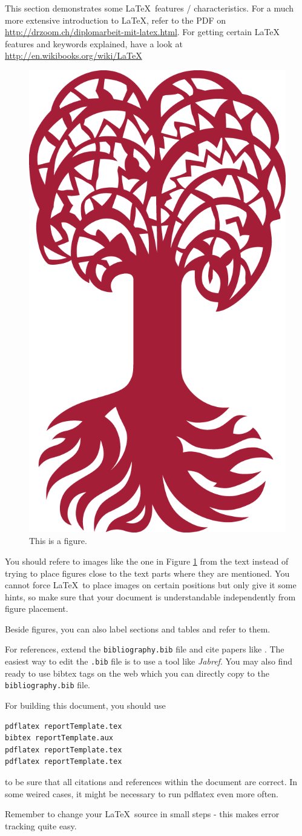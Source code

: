 \documentclass{utue} %
\begin{document}
This section demonstrates some \LaTeX~features / characteristics. For a much more extensive introduction to \LaTeX, refer to the PDF on \url{http://drzoom.ch/diplomarbeit-mit-latex.html}. For getting certain LaTeX features and keywords explained, have a look at \url{http://en.wikibooks.org/wiki/LaTeX}

\begin{figure}[h!]
  \centering
  \includegraphics[width=.4\columnwidth]{images/Tuebingen_CorporateElements/UT_BM_Rot_RGB_tr_01.png}
  \caption{This is a figure.}
  \label{fig:figure1}
\end{figure}

You should refere to images like the one in Figure \ref{fig:figure1} from the text instead of trying to place figures close to the text parts where they are mentioned. You cannot force \LaTeX~to place images on certain positions but only give it some hints, so make sure that your document is understandable independently from figure placement.

Beside figures, you can also label sections and tables and refer to them.

For references, extend the \texttt{bibliography.bib} file and cite papers like \cite{Miller1995}. The easiest way to edit the \texttt{.bib} file is to use a tool like \emph{Jabref}. You may also find ready to use bibtex tags on the web which you can directly copy to the \texttt{bibliography.bib} file.

For building this document, you should use 
\begin{lstlisting}[firstnumber=1]
pdflatex reportTemplate.tex
bibtex reportTemplate.aux
pdflatex reportTemplate.tex
pdflatex reportTemplate.tex
\end{lstlisting}
to be sure that all citations and references within the document are correct. In some weired cases, it might be necessary to run pdflatex even more often.

Remember to change your \LaTeX~source in small steps - this makes error tracking quite easy.




\end{document}
